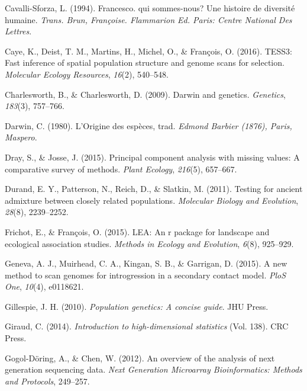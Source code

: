 \documentclass[12pt,twoside]{reedthesis}
\begin{document}
  \hypertarget{ref-cavalli1994francesco}{}
  Cavalli-Sforza, L. (1994). Francesco. qui sommes-nous? Une histoire de
  diversité humaine. \emph{Trans. Brun, Françoise. Flammarion Ed. Paris:
  Centre National Des Lettres}.
  
  \hypertarget{ref-caye2016tess3}{}
  Caye, K., Deist, T. M., Martins, H., Michel, O., \& François, O. (2016).
  TESS3: Fast inference of spatial population structure and genome scans
  for selection. \emph{Molecular Ecology Resources}, \emph{16}(2),
  540--548.
  
  \hypertarget{ref-charlesworth2009darwin}{}
  Charlesworth, B., \& Charlesworth, D. (2009). Darwin and genetics.
  \emph{Genetics}, \emph{183}(3), 757--766.
  
  \hypertarget{ref-darwin1980origine}{}
  Darwin, C. (1980). L'Origine des espèces, trad. \emph{Edmond Barbier
  (1876), Paris, Maspero}.
  
  \hypertarget{ref-dray2015principal}{}
  Dray, S., \& Josse, J. (2015). Principal component analysis with missing
  values: A comparative survey of methods. \emph{Plant Ecology},
  \emph{216}(5), 657--667.
  
  \hypertarget{ref-durand2011testing}{}
  Durand, E. Y., Patterson, N., Reich, D., \& Slatkin, M. (2011). Testing
  for ancient admixture between closely related populations.
  \emph{Molecular Biology and Evolution}, \emph{28}(8), 2239--2252.
  
  \hypertarget{ref-frichot2015lea}{}
  Frichot, E., \& François, O. (2015). LEA: An r package for landscape and
  ecological association studies. \emph{Methods in Ecology and Evolution},
  \emph{6}(8), 925--929.
  
  \hypertarget{ref-geneva2015new}{}
  Geneva, A. J., Muirhead, C. A., Kingan, S. B., \& Garrigan, D. (2015). A
  new method to scan genomes for introgression in a secondary contact
  model. \emph{PloS One}, \emph{10}(4), e0118621.
  
  \hypertarget{ref-gillespie2010population}{}
  Gillespie, J. H. (2010). \emph{Population genetics: A concise guide}.
  JHU Press.
  
  \hypertarget{ref-giraud2014introduction}{}
  Giraud, C. (2014). \emph{Introduction to high-dimensional statistics}
  (Vol. 138). CRC Press.
  
  \hypertarget{ref-gogol2012overview}{}
  Gogol-Döring, A., \& Chen, W. (2012). An overview of the analysis of
  next generation sequencing data. \emph{Next Generation Microarray
  Bioinformatics: Methods and Protocols}, 249--257.
  
\end{document}

